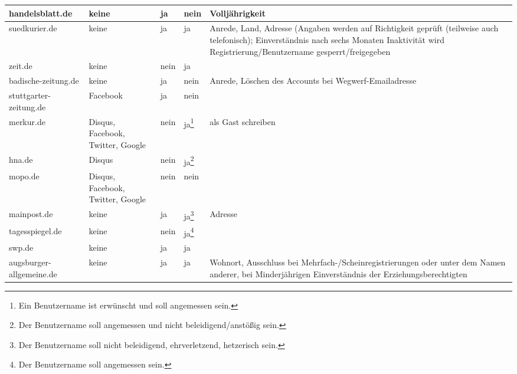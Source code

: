 \begin{landscape}
\begin{longtable}{lp{28mm}p{20mm}p{20mm}p{90mm}}
handelsblatt.de %
& keine
& ja
& nein
& Volljährigkeit
\\\midrule

suedkurier.de %
& keine
& ja
& ja
& Anrede, Land, Adresse (Angaben werden auf Richtigkeit geprüft (teilweise auch
  telefonisch); Einverständnis nach sechs Monaten Inaktivität wird
  Registrierung/Benutzername gesperrt/freigegeben
\\\midrule

zeit.de %
& keine
& nein
& ja
&
\\\midrule

badische-zeitung.de %
& keine
& ja
& nein
& Anrede, Löschen des Accounts bei Wegwerf-Emailadresse
\\\midrule

stuttgarter-zeitung.de %
& Facebook
& ja
& nein
&
\\\midrule

merkur.de %
& Disqus, Facebook, Twitter, Google
& nein
& ja\footnote{Ein Benutzername ist erwünscht und soll angemessen sein.}
& als Gast schreiben
\\\midrule

hna.de %
& Disqus
& nein
& ja\footnote{Der Benutzername soll angemessen und nicht beleidigend/anstößig
  sein.}
&
\\\midrule

mopo.de %
& Disqus, Facebook, Twitter, Google
& nein
& nein
&
\\\midrule

mainpost.de %
& keine
& ja
& ja\footnote{Der Benutzername soll nicht beleidigend, ehrverletzend, hetzerisch
  sein.}
& Adresse
\\\midrule

tagesspiegel.de %
& keine
& nein
& ja\footnote{Der Benutzername soll angemessen sein.}
&
\\\midrule

swp.de %
& keine
& ja
& ja
&
\\\midrule

augsburger-allgemeine.de %
& keine
& ja
& ja
& Wohnort, Ausschluss bei Mehrfach-/Scheinregistrierungen oder unter dem Namen
  anderer, bei Minderjährigen Einverständnis der Erziehungsberechtigten

\end{longtable}
\end{landscape}

